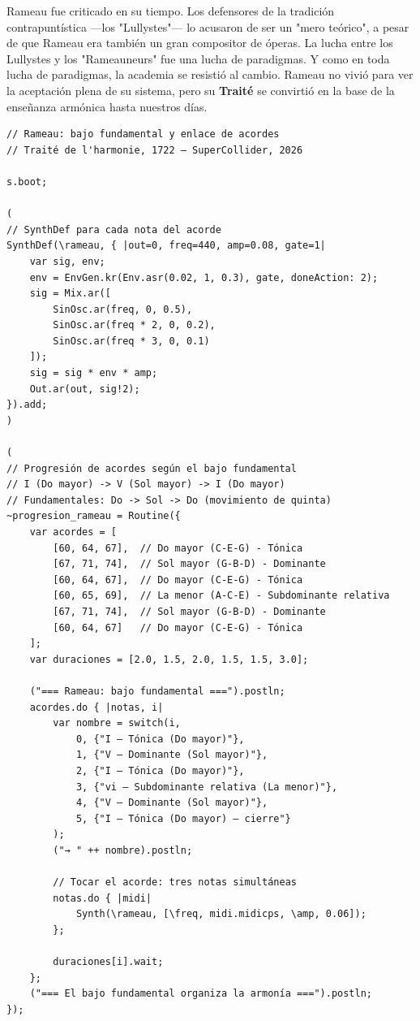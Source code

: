 \documentclass[14pt, a4paper]{article}
\begin{document}
\begin{enumerate}
Rameau fue criticado en su tiempo. Los defensores de la tradición
contrapuntística —los "Lullystes"— lo acusaron de ser un "mero
teórico", a pesar de que Rameau era también un gran compositor de
óperas. La lucha entre los Lullystes y los "Rameauneurs" fue una lucha
de paradigmas. Y como en toda lucha de paradigmas, la academia se
resistió al cambio. Rameau no vivió para ver la aceptación plena de su
sistema, pero su \textbf{Traité} se convirtió en la base de la enseñanza
armónica hasta nuestros días.

\begin{verbatim}
// Rameau: bajo fundamental y enlace de acordes
// Traité de l'harmonie, 1722 — SuperCollider, 2026

s.boot;

(
// SynthDef para cada nota del acorde
SynthDef(\rameau, { |out=0, freq=440, amp=0.08, gate=1|
    var sig, env;
    env = EnvGen.kr(Env.asr(0.02, 1, 0.3), gate, doneAction: 2);
    sig = Mix.ar([
        SinOsc.ar(freq, 0, 0.5),
        SinOsc.ar(freq * 2, 0, 0.2),
        SinOsc.ar(freq * 3, 0, 0.1)
    ]);
    sig = sig * env * amp;
    Out.ar(out, sig!2);
}).add;
)

(
// Progresión de acordes según el bajo fundamental
// I (Do mayor) -> V (Sol mayor) -> I (Do mayor)
// Fundamentales: Do -> Sol -> Do (movimiento de quinta)
~progresion_rameau = Routine({
    var acordes = [
        [60, 64, 67],  // Do mayor (C-E-G) - Tónica
        [67, 71, 74],  // Sol mayor (G-B-D) - Dominante
        [60, 64, 67],  // Do mayor (C-E-G) - Tónica
        [60, 65, 69],  // La menor (A-C-E) - Subdominante relativa
        [67, 71, 74],  // Sol mayor (G-B-D) - Dominante
        [60, 64, 67]   // Do mayor (C-E-G) - Tónica
    ];
    var duraciones = [2.0, 1.5, 2.0, 1.5, 1.5, 3.0];

    ("=== Rameau: bajo fundamental ===").postln;
    acordes.do { |notas, i|
        var nombre = switch(i,
            0, {"I — Tónica (Do mayor)"},
            1, {"V — Dominante (Sol mayor)"},
            2, {"I — Tónica (Do mayor)"},
            3, {"vi — Subdominante relativa (La menor)"},
            4, {"V — Dominante (Sol mayor)"},
            5, {"I — Tónica (Do mayor) — cierre"}
        );
        ("→ " ++ nombre).postln;

        // Tocar el acorde: tres notas simultáneas
        notas.do { |midi|
            Synth(\rameau, [\freq, midi.midicps, \amp, 0.06]);
        };

        duraciones[i].wait;
    };
    ("=== El bajo fundamental organiza la armonía ===").postln;
});


\end{verbatim}
\end{enumerate}
\end{document}
